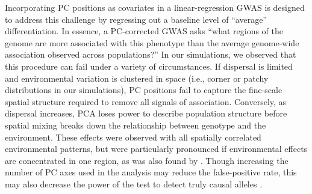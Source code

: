 \documentclass[10pt,twoside,lineno,hidelinks]{preprint}
\begin{document}
Incorporating PC positions as covariates in a linear-regression GWAS \citep{Price2006} is designed to address this challenge by regressing out a baseline level of ``average'' differentiation. 
In essence, a PC-corrected GWAS asks ``what regions of the genome are more associated with this phenotype than the average genome-wide association observed across populations?'' 
In our simulations, we observed that this procedure can fail under a variety of circumstances. 
If dispersal is limited and environmental variation is clustered in space (i.e., corner or patchy distributions in our simulations), PC positions fail to capture the fine-scale spatial structure required to remove all signals of association. Conversely, as dispersal increases, PCA loses power to describe population structure before spatial mixing breaks down the relationship between genotype and the environment. These effects were observed with all spatially correlated environmental patterns, but were particularly pronounced if environmental effects are concentrated in one region, as was also found by \citet{Mathieson2012}. Though increasing the number of PC axes used in the analysis may reduce the false-positive rate, this may also decrease the power of the test to detect truly causal alleles \citep{Lawson2019}. 
\end{document}
